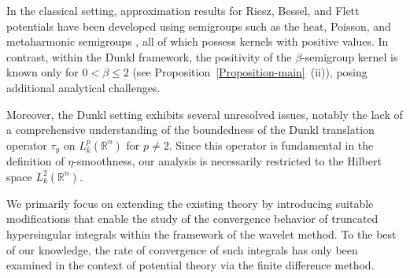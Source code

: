 \documentclass[11pt,a4paper,reqno]{amsproc}
\theoremstyle{definition}
\theoremstyle{remark}
\numberwithin{equation}{section}
\begin{document}
In the classical setting, approximation results for Riesz, Bessel, and Flett potentials have been developed using semigroups such as the heat, Poisson, and metaharmonic semigroups \cite{Aliev-2014, Aliev-2013, Bayrakci, Eryigit}, all of which possess kernels with positive values. In contrast, within the Dunkl framework, the positivity of the \(\beta\)-semigroup kernel is known only for \( 0 < \beta \leq 2 \) (see Proposition~\ref{Proposition-main}~(ii)), posing additional analytical challenges.

Moreover, the Dunkl setting exhibits several unresolved issues, notably the lack of a comprehensive understanding of the boundedness of the Dunkl translation operator \( \tau_y \) on \( L_k^p(\mathbb{R}^n) \) for \(p\neq 2 \). Since this operator is fundamental in the definition of \(\eta\)-smoothness, our analysis is necessarily restricted to the Hilbert space \( L_k^2(\mathbb{R}^n) \).

We primarily focus on extending the existing theory by introducing suitable modifications that enable the study of the convergence behavior of truncated hypersingular integrals within the framework of the wavelet method. To the best of our knowledge, the rate of convergence of such integrals has only been examined in the context of potential theory via the finite difference method.
\end{document}
